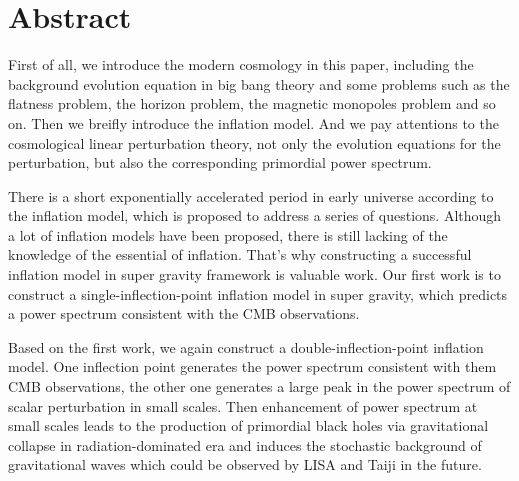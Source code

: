 \intobmk\chapter*{Abstract}%

First of all, we introduce the modern cosmology in this paper, including
the background evolution equation in big bang theory and some problems such as the 
flatness problem, the horizon problem, the magnetic monopoles problem and
so on. Then we breifly introduce the inflation model. And we pay attentions
to the cosmological linear perturbation theory, not only the evolution
equations for the perturbation, but also the corresponding primordial power
spectrum.

There is a short exponentially accelerated period in early universe
according to the inflation model, which is proposed to address a series of
questions. Although a lot of inflation models have been proposed, there is
still lacking of the knowledge of the essential of inflation. That's why
constructing a successful inflation model in super gravity framework is
valuable work. Our first work is to construct a single-inflection-point
inflation model in super gravity, which predicts a power spectrum
consistent with the CMB observations.

Based on the first work, we again construct a double-inflection-point
inflation model. One inflection point generates the power spectrum
consistent with them CMB observations, the other one generates a large peak 
in the power spectrum of scalar perturbation in small scales. Then
enhancement of power spectrum at small scales leads to the production of
primordial black holes via gravitational collapse in radiation-dominated
era and induces the stochastic background of gravitational waves which
could be observed by LISA and Taiji in the future.


